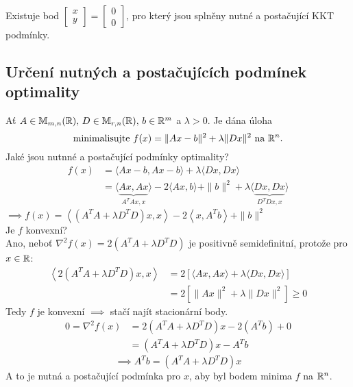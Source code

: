 Existuje bod $
\begin{bmatrix}
x \\
y    
\end{bmatrix} =
\begin{bmatrix}
    0 \\
    0
\end{bmatrix}$, pro který jsou splněny nutné a postačující KKT podmínky.

\subsection{Určení nutných a postačujících podmínek optimality}
Ať $A \in \mathbb{M}_{m,n} (\mathbb{R}), \, D \in \mathbb{M}_{r,n}(\mathbb{R}), \, b\in \mathbb{R}^m$ a $\lambda > 0$. Je dána úloha
\[
    \text{minimalisujte } f(x) = \| Ax - b\|^2 + \lambda \| Dx\|^2  \text{ na } \mathbb{R}^n.
\]
Jaké jsou nutnné a postačující podmínky optimality?
\begin{align*}
    f(x) &= \langle Ax - b, Ax - b\rangle + \lambda \langle Dx, Dx\rangle \\
    &= \langle \underbrace{Ax, Ax}_{A^TAx, x}\rangle - 2\langle Ax, b\rangle + \| b\|^2 + \lambda \langle 
        \underbrace{Dx, Dx}_{D^TDx, x}\rangle
\end{align*}
$\implies f(x) = \left\langle \left(A^TA + \lambda D^TD\right)x, x\right\rangle - 2 \left\langle x, A^T b\right\rangle 
+ \| b\|^2$\\
Je $f$ konvexní?\\
Ano, neboť $\nabla^2 f(x) = 2(A^TA + \lambda D^TD)$ je positivně semidefinitní, protože pro $x \in \mathbb{R}$:
\begin{align*}
    \left\langle 2\left(A^TA + \lambda D^TD\right)x, x\right\rangle &= 2 \left[ \langle Ax, Ax\rangle + \lambda 
    \langle Dx, Dx\rangle\right] \\
    &= 2 \left[ \|Ax\|^2 + \lambda \|Dx\|^2\right] \geq 0
\end{align*}
Tedy $f$ je konvexní $\implies$ stačí najít stacionární body.
\begin{align*}
    0 = \nabla^2 f(x) &= 2 (A^TA + \lambda D^TD)x - 2(A^Tb) + 0 \\
    &= (A^TA + \lambda D^TD)x - A^Tb
\end{align*}
\[
    \implies A^Tb = (A^TA + \lambda D^TD)x
\]
A to je nutná a postačující podmínka pro $x$, aby byl bodem minima $f$ na $\mathbb{R}^n$.
    
